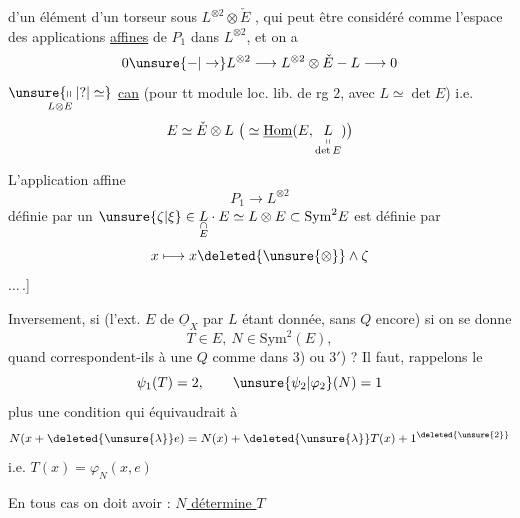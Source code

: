 d'un élément d'un torseur sous $L^{\otimes2}\otimes\check E$ , qui  peut être considéré comme l'espace des applications \uline{affines} de $P_1$ dans $L^{\otimes2}$,   et on a
\[
0\unsure{\mathbin{-}|\to}L^{\otimes2}\longrightarrow L^{\otimes2}\otimes\check E\mathbin{-}L\longrightarrow0
\]
$\underset{L\otimes E}{\unsure{\shortparallel|?|\simeq}}$ \uline{can} (pour tt module loc. lib. de rg $2$,  avec $L\simeq\det E$) i.e.
\[
E\simeq\check E\otimes L\ \big(\simeq\underline{\mathrm{Hom}}(E,\underset{\substack{\shortparallel\\\det E}}L)\big)
\]

L'application affine
\[
P_1\longrightarrow L^{\otimes2}
\]
définie par un $\unsure{\zeta|\xi}\in\underset{\substack{\cap\\E}}L\cdot E\simeq L\otimes E\subset\mathrm{Sym}^2E$
est définie par
\[
x\longmapsto x\deleted{\unsure{\otimes}}\wedge\zeta
\]
$\ldots\,.$]

Inversement, si (l'ext. $E$ de $\underline O_X$ par $L$ étant donnée, sans $Q$ encore) si on se donne
\[
T\in E,\ N\in\mathrm{Sym}^2(E),
\]
quand correspondent-ils à une $Q$ comme dans 3) ou 3$'$) ? Il faut, rappelons le
\[
\psi_1(T)=2,\qquad\unsure{\psi_2|\varphi_2}(N)=1
\]
plus une condition qui équivaudrait à
\[
N(x+\deleted{\unsure{\lambda}}e)=N(x)+\deleted{\unsure{\lambda}}T(x)+1^{\deleted{\unsure{2}}}
\]
i.e. $T(x)=\varphi_N(x,e)$

En tous cas on doit avoir : \uline{$N$ détermine $T$}
